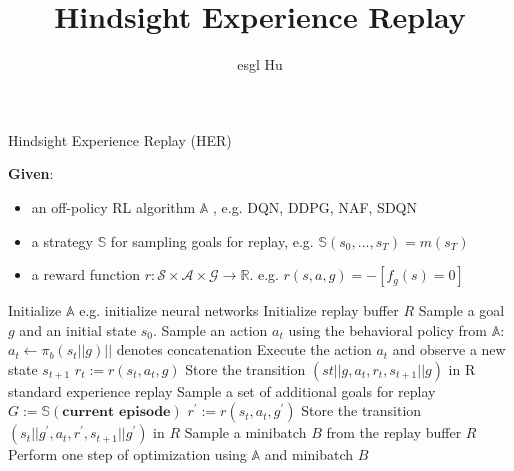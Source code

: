 \documentclass[12pt,a4paper]{article}
\begin{document}
\title{Hindsight Experience Replay\cite{Andrychowicz2017Hindsight}}
\author{esgl Hu}
\maketitle
\begin{algorithm}
\caption{Hindsight Experience Replay (HER)}
\begin{algorithmic}
	\State \textbf{Given}: 
		\begin{itemize}
			\item an off-policy RL algorithm $\mathbb{A}$	, \Comment e.g. DQN, DDPG, NAF, SDQN
			\item a strategy $\mathbb{S}$ for sampling goals for replay,	 \Comment e.g. $\mathbb{S}(s_{0}, ..., s_{T})=m(s_{T})$
			\item a reward function $r:\mathcal{S} \times \mathcal{A} \times \mathcal{G} \rightarrow \mathbb{R}$. \Comment e.g. $r(s,a,g)=-[f_{g}(s)=0]$
		\end{itemize}
	\State Initialize $\mathbb{A}$ \Comment e.g. initialize neural networks
	\State Initialize replay buffer $R$
		\State Sample a goal $g$ and an initial state $s_{0}$.
			\State Sample an action $a_{t}$ using the behavioral policy from $\mathbb{A}$:\\\qquad\qquad\qquad$a_{t} \leftarrow \pi_{b}(s_{t}||g)$\Comment $||$ denotes concatenation
			\State Execute the action $a_t$ and observe a new state $s_{t+1}$
		\EndFor
			\State $r_t := r(s_t, a_t, g)$
			\State Store the transition $(s{t}||g, a_t, r_t, s_{t+1}||g)$ in R \Comment standard experience replay
			\State Sample a set of additional goals for replay 
			$G:= \mathbb{S}(\textbf{current episode})$
				\State $r^{'} := r(s_t, a_t, g^{'})$
				\State Store the transition $(s_{t}||g^{'}, a_{t}, r^{'}, s_{t+1}||g^{'})$ in $R$
			\EndFor
		\EndFor
			\State Sample a minibatch $B$ from the replay buffer $R$
			\State Perform one step of optimization using 
		$\mathbb{A}$ and minibatch $B$
		\EndFor
	\EndFor
	
		
\end{algorithmic}
\end{algorithm}


\end{document}
